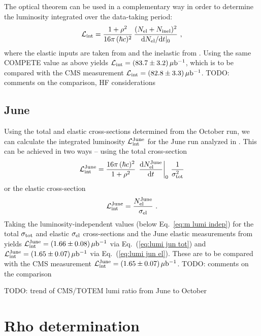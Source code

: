 \documentclass[doublecol]{epl/epl2}
\def\d{{\rm d}}
\def\un#1{\,{\rm #1}}
\begin{document}
The optical theorem can be used in a complementary way in order to determine the luminosity integrated over the data-taking period:
\begin{equation}
\label{eq:lumi oct}
{\cal L_{\rm int}} = {1 + \rho^2 \over 16\pi\, (\hbar c)^2}\, { (N_{\rm el} + N_{\rm inel})^2 \over \d N_{\rm el}/\d t|_0 }\ ,
\end{equation}
where the elastic inputs are taken from \cite{P1} and the inelastic from \cite{P2}. Using the same COMPETE value as above yields ${\cal L_{\rm int}} = (83.7 \pm 3.2) \un{\mu b^{-1}}$, which is to be compared with the CMS measurement ${\cal L_{\rm int}} = (82.8 \pm 3.3) \un{\mu b^{-1}}$. TODO: comments on the comparison, HF considerations

\subsection{June}

Using the total and elastic cross-sections determined from the October run, we can calculate the integrated luminosity ${\cal L}_{\rm int}^{\rm June}$ for the June run analyzed in \cite{epl96}. This can be achieved in two ways -- using the total cross-section
\begin{equation}
\label{eq:lumi jun tot}
{\cal L}_{\rm int}^{\rm June} =  {16\pi\, (\hbar c)^2\over 1 + \rho^2}\, \left. \d N_{\rm el}^{\rm June}\over\d t\right|_0\, {1\over \sigma_{\rm tot}^2}
\end{equation}
or the elastic cross-section
\begin{equation}
\label{eq:lumi jun el}
{\cal L}_{\rm int}^{\rm June} = {N_{\rm el}^{\rm June}\over \sigma_{\rm el}}\ .
\end{equation}
Taking the luminosity-independent values (below Eq.~\ref{eq:m lumi indep}) for the total $\sigma_{\rm tot}$ and elastic $\sigma_{\rm el}$ cross-sections and the June elastic measurements from \cite{epl96} yields
${\cal L}_{\rm int}^{\rm June} = (1.66 \pm 0.08)\un{\mu b^{-1}}$ via Eq.~(\ref{eq:lumi jun tot}) and
${\cal L}_{\rm int}^{\rm June} = (1.65 \pm 0.07)\un{\mu b^{-1}}$ via Eq.~(\ref{eq:lumi jun el}). These are to be compared with the CMS measurement
${\cal L}_{\rm int}^{\rm June} = (1.65 \pm 0.07)\un{\mu b^{-1}}$. TODO: comments on the comparison

TODO: trend of CMS/TOTEM lumi ratio from June to October



\section{Rho determination}
\end{document}
